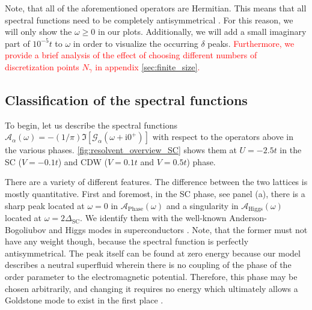 \documentclass[
    reprint, 
    aps,
    preprintnumbers,
    twocolumn,
    prb,
    superscriptaddress
]{revtex4-2}
\newcommand{\im}{\mathrm{i}}
\newcommand{\spectral}[1]{\mathcal{A}_\text{#1}  (\omega)}
\begin{document}
Note, that all of the aforementioned operators are Hermitian. 
This means that all spectral functions need to be completely antisymmetrical \cite{rickayzen80}.%
For this reason, we will only show the $\omega \geq 0$ in our plots. 
Additionally, we will add a small imaginary part of $10^{-5}t$ to $\omega$ in order to visualize the occurring $\delta$ peaks.
\textcolor{red}{Furthermore, we provide a brief analysis of the effect of choosing different numbers of discretization points $N_\gamma$ in appendix \ref{sec:finite_size}.}


\subsection{Classification of the spectral functions}

To begin, let us describe the spectral functions $\mathcal{A}_\alpha (\omega) = - (1/\pi) \Im [\mathcal{G}_\alpha (\omega + \im 0^+)]$ with respect to the operators above in the various phases.
\autoref{fig:resolvent_overview_SC} shows them at $U = -2.5t$ in the SC ($V=-0.1t$) and CDW ($V=0.1t$ and $V=0.5t$) phase.

There are a variety of different features. The difference between the two lattices is mostly quantitative.
First and foremost, in the SC phase, see panel (a), 
there is a sharp peak located at $\omega=0$ in $\spectral{Phase}$ and a singularity in $\spectral{Higgs}$ located at $\omega=2\Delta_\text{SC}$.
We identify them with the well-known Anderson-Bogoliubov and Higgs modes in superconductors \cite{Bogoljubov1958,Anderson58,Brieskorn74,Schmid1975,simanek1975,schoen1976propagating,Kulik1981,Maiti2015,Sun2020,Fan22,Schmid1975,Varma02,Cea14,Measson14,Tsuji15,Krull16,Mueller2019,Schwarz20}.
Note, that the former must not have any weight though, because the spectral function is perfectly antisymmetrical.
The peak itself can be found at zero energy because our model describes a neutral superfluid 
wherein there is no coupling of the phase of the order parameter to the electromagnetic potential.
Therefore, this phase may be chosen arbitrarily, and changing it requires no energy 
which ultimately allows a Goldstone mode to exist in the first place \cite{Goldstone1961,Anderson63}.
\end{document}
